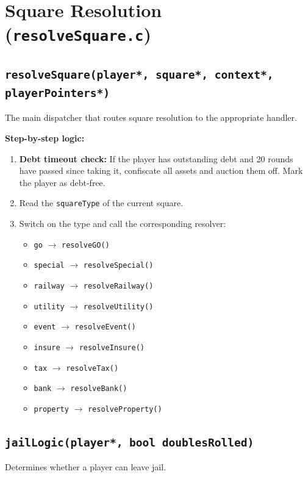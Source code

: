 \documentclass[12pt,a4paper]{article}
\begin{document}
\section{Square Resolution (\texttt{resolveSquare.c})}

\subsection{\texttt{resolveSquare(player*, square*, context*, playerPointers*)}}
The main dispatcher that routes square resolution to the appropriate handler.

\textbf{Step-by-step logic:}
\begin{enumerate}[noitemsep]
    \item \textbf{Debt timeout check:} If the player has outstanding debt and 20 rounds have passed since taking it, confiscate all assets and auction them off. Mark the player as debt-free.
    \item Read the \texttt{squareType} of the current square.
    \item Switch on the type and call the corresponding resolver:
    \begin{itemize}[noitemsep]
        \item \texttt{go} $\rightarrow$ \texttt{resolveGO()}
        \item \texttt{special} $\rightarrow$ \texttt{resolveSpecial()}
        \item \texttt{railway} $\rightarrow$ \texttt{resolveRailway()}
        \item \texttt{utility} $\rightarrow$ \texttt{resolveUtility()}
        \item \texttt{event} $\rightarrow$ \texttt{resolveEvent()}
        \item \texttt{insure} $\rightarrow$ \texttt{resolveInsure()}
        \item \texttt{tax} $\rightarrow$ \texttt{resolveTax()}
        \item \texttt{bank} $\rightarrow$ \texttt{resolveBank()}
        \item \texttt{property} $\rightarrow$ \texttt{resolveProperty()}
    \end{itemize}
\end{enumerate}

\subsection{\texttt{jailLogic(player*, bool doublesRolled)}}
Determines whether a player can leave jail.
\end{document}
